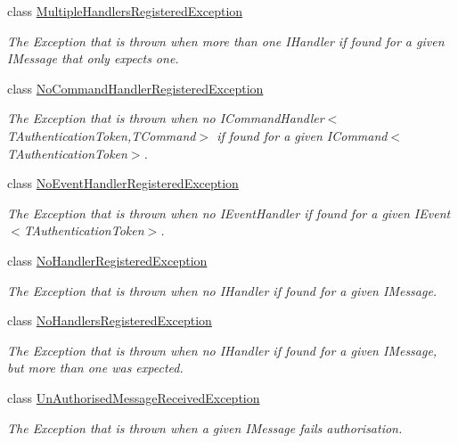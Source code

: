 \begin{DoxyCompactItemize}
class \hyperlink{classCqrs_1_1Exceptions_1_1MultipleHandlersRegisteredException}{Multiple\+Handlers\+Registered\+Exception}
\begin{DoxyCompactList}\small\item\em The Exception that is thrown when more than one I\+Handler if found for a given I\+Message that only expects one. \end{DoxyCompactList}\item 
class \hyperlink{classCqrs_1_1Exceptions_1_1NoCommandHandlerRegisteredException}{No\+Command\+Handler\+Registered\+Exception}
\begin{DoxyCompactList}\small\item\em The Exception that is thrown when no I\+Command\+Handler$<$\+T\+Authentication\+Token,\+T\+Command$>$ if found for a given I\+Command$<$\+T\+Authentication\+Token$>$. \end{DoxyCompactList}\item 
class \hyperlink{classCqrs_1_1Exceptions_1_1NoEventHandlerRegisteredException}{No\+Event\+Handler\+Registered\+Exception}
\begin{DoxyCompactList}\small\item\em The Exception that is thrown when no I\+Event\+Handler if found for a given I\+Event$<$\+T\+Authentication\+Token$>$. \end{DoxyCompactList}\item 
class \hyperlink{classCqrs_1_1Exceptions_1_1NoHandlerRegisteredException}{No\+Handler\+Registered\+Exception}
\begin{DoxyCompactList}\small\item\em The Exception that is thrown when no I\+Handler if found for a given I\+Message. \end{DoxyCompactList}\item 
class \hyperlink{classCqrs_1_1Exceptions_1_1NoHandlersRegisteredException}{No\+Handlers\+Registered\+Exception}
\begin{DoxyCompactList}\small\item\em The Exception that is thrown when no I\+Handler if found for a given I\+Message, but more than one was expected. \end{DoxyCompactList}\item 
class \hyperlink{classCqrs_1_1Exceptions_1_1UnAuthorisedMessageReceivedException}{Un\+Authorised\+Message\+Received\+Exception}
\begin{DoxyCompactList}\small\item\em The Exception that is thrown when a given I\+Message fails authorisation. \end{DoxyCompactList}\end{DoxyCompactItemize}

